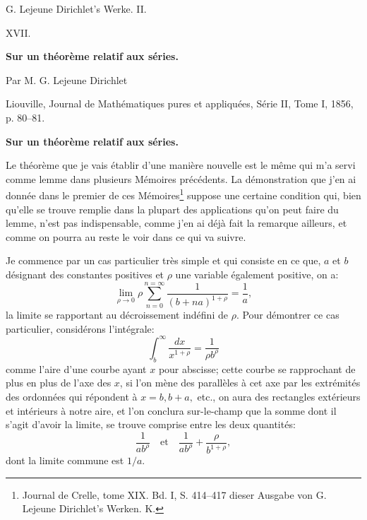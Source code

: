 \documentclass[11pt]{article}
\begin{document}
\begin{center}
{\Large G. Lejeune Dirichlet's Werke. II.}\par\vspace{1.2em}
{\Large XVII.}\par\vspace{0.5em}
{\LARGE \textbf{Sur un théorème relatif aux séries.}}\par\vspace{1em}
{\large Par M. G. Lejeune Dirichlet}\par\vspace{0.5em}
{\small Liouville, Journal de Mathématiques pures et appliquées, Série II, Tome I, 1856, p. 80--81.}
\end{center}

\begin{center}
{\large \textbf{Sur un théorème relatif aux séries.}}
\end{center}

Le théorème que je vais établir d'une manière nouvelle est le même qui m'a servi comme lemme dans plusieurs Mémoires précédents. La démonstration que j'en ai donnée dans le premier de ces Mémoires\footnote{Journal de Crelle, tome XIX. Bd. I, S. 414--417 dieser Ausgabe von G. Lejeune Dirichlet's Werken. K.} suppose une certaine condition qui, bien qu'elle se trouve remplie dans la plupart des applications qu'on peut faire du lemme, n'est pas indispensable, comme j'en ai déjà fait la remarque ailleurs, et comme on pourra au reste le voir dans ce qui va suivre.

Je commence par un cas particulier très simple et qui consiste en ce que, \(a\) et \(b\) désignant des constantes positives et \(\rho\) une variable également positive, on a:
\[
\lim_{\rho\to0}\rho\sum_{n=0}^{n=\infty}\frac{1}{(b+na)^{1+\rho}}=\frac{1}{a},
\]
la limite se rapportant au décroissement indéfini de \(\rho\). Pour démontrer ce cas particulier, considérons l'intégrale:
\[
\int_b^\infty\frac{dx}{x^{1+\rho}}=\frac{1}{\rho b^\rho}
\]
comme l'aire d'une courbe ayant \(x\) pour abscisse; cette courbe se rapprochant de plus en plus de l'axe des \(x\), si l'on mène des parallèles à cet axe par les extrémités des ordonnées qui répondent à \(x=b,b+a,\) etc., on aura des rectangles extérieurs et intérieurs à notre aire, et l'on conclura sur-le-champ que la somme dont il s'agit d'avoir la limite, se trouve comprise entre les deux quantités:
\[
\frac{1}{ab^\rho}
\quad\text{et}\quad
\frac{1}{ab^\rho}+\frac{\rho}{b^{1+\rho}},
\]
dont la limite commune est \(1/a\).
\end{document}
